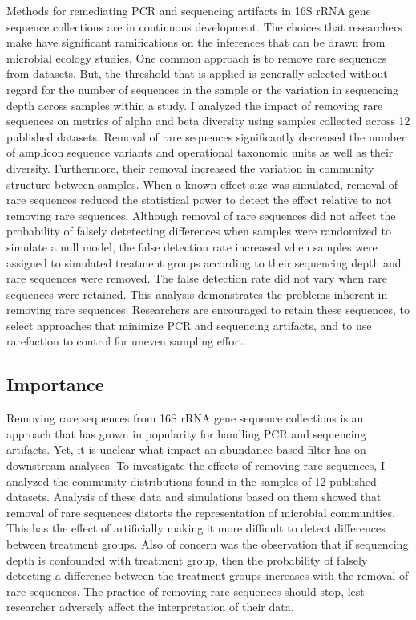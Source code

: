 \documentclass[
]{article}
\begin{document}
Methods for remediating PCR and sequencing artifacts in 16S rRNA gene
sequence collections are in continuous development. The choices that
researchers make have significant ramifications on the inferences that
can be drawn from microbial ecology studies. One common approach is to
remove rare sequences from datasets. But, the threshold that is applied
is generally selected without regard for the number of sequences in the
sample or the variation in sequencing depth across samples within a
study. I analyzed the impact of removing rare sequences on metrics of
alpha and beta diversity using samples collected across 12 published
datasets. Removal of rare sequences significantly decreased the number
of amplicon sequence variants and operational taxonomic units as well as
their diversity. Furthermore, their removal increased the variation in
community structure between samples. When a known effect size was
simulated, removal of rare sequences reduced the statistical power to
detect the effect relative to not removing rare sequences. Although
removal of rare sequences did not affect the probability of falsely
detetecting differences when samples were randomized to simulate a null
model, the false detection rate increased when samples were assigned to
simulated treatment groups according to their sequencing depth and rare
sequences were removed. The false detection rate did not vary when rare
sequences were retained. This analysis demonstrates the problems
inherent in removing rare sequences. Researchers are encouraged to
retain these sequences, to select approaches that minimize PCR and
sequencing artifacts, and to use rarefaction to control for uneven
sampling effort.

\newpage

\hypertarget{importance}{%
\subsection{Importance}\label{importance}}

Removing rare sequences from 16S rRNA gene sequence collections is an
approach that has grown in popularity for handling PCR and sequencing
artifacts. Yet, it is unclear what impact an abundance-based filter has
on downstream analyses. To investigate the effects of removing rare
sequences, I analyzed the community distributions found in the samples
of 12 published datasets. Analysis of these data and simulations based
on them showed that removal of rare sequences distorts the
representation of microbial communities. This has the effect of
artificially making it more difficult to detect differences between
treatment groups. Also of concern was the observation that if sequencing
depth is confounded with treatment group, then the probability of
falsely detecting a difference between the treatment groups increases
with the removal of rare sequences. The practice of removing rare
sequences should stop, lest researcher adversely affect the
interpretation of their data.
\end{document}
